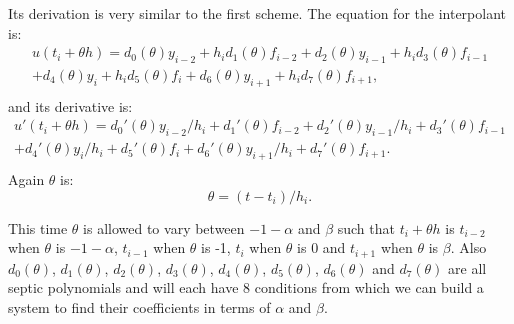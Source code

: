 Its derivation is very similar to the first scheme. The equation for the interpolant is:
\begin{equation}
\begin{split}
u(t_i + \theta h) = d_{0}(\theta)y_{i-2} +  h_id_{1}(\theta)f_{i-2} 
+ d_{2}(\theta)y_{i-1}     +  h_id_{3}(\theta)f_{i-1} \\
+ d_{4}(\theta)y_i     +  h_id_{5}(\theta)f_i 
+ d_{6}(\theta)y_{i + 1} + h_id_{7}(\theta)f_{i + 1}, \\
\end{split}
\end{equation}
and its derivative is:
\begin{equation}
\begin{split}
u'(t_i + \theta h) = d_{0}'(\theta)y_{i-2}/h_i +  d_{1}'(\theta)f_{i-2}
+ d_{2}'(\theta)y_{i-1}/h_i   +  d_{3}'(\theta)f_{i-1} \\
+ d_{4}'(\theta)y_i/h_i       +  d_{5}'(\theta)f_i
+ d_{6}'(\theta)y_{i + 1}/h_i +  d_{7}'(\theta)f_{i + 1}. \\
\end{split}
\end{equation}
Again $\theta$ is:
\begin{equation}
\theta = (t - t_i) / h_i.
\end{equation}

This time $\theta$ is allowed to vary between $-1-\alpha$ and $\beta$ such that $t_i + \theta h$ is $t_{i-2}$ when $\theta$ is $-1-\alpha$, $t_{i-1}$ when $\theta$ is -1, $t_i$ when $\theta$ is 0 and $t_{i + 1}$ when $\theta$ is $\beta$. Also $d_0(\theta)$, $d_1(\theta)$, $d_2(\theta)$, $d_3(\theta)$, $d_4(\theta)$, $d_5(\theta)$, $d_6(\theta)$ and $d_7(\theta)$ are all septic polynomials and will each have 8 conditions from which we can build a system to find their coefficients in terms of $\alpha$ and $\beta$.

